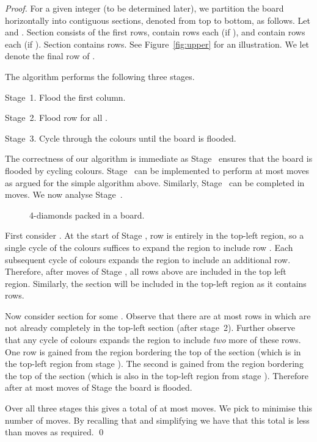 \documentclass[a4paper,11pt]{llncs}
\newcommand{\pgfgraphic}[1]{}
\newcounter{l}
\newcommand{\recdim}[2]{}
\begin{document}
\begin{proof}

For a given integer  (to be determined later), we partition the board horizontally into  contiguous sections, denoted  from top to bottom, as follows. Let  and . Section  consists of the first  rows,  contain  rows each (if ), and  contain  rows each (if ). Section  contains  rows. See Figure~\ref{fig:upper} for an illustration. We let  denote the final row of .

The algorithm performs the following three stages.
\begin{description}
    \item{Stage~1.} Flood the first column.
    \item{Stage~2.} Flood row  for all .
    \item{Stage~3.} Cycle through the  colours until the board is flooded.
\end{description}


The correctness of our algorithm is immediate as Stage~ ensures that the board is flooded by cycling colours. Stage~ can be implemented to perform at most  moves as argued for the simple algorithm above. Similarly, Stage~ can be completed in  moves. We now analyse Stage~.
\begin{figure}[t]
    \begin{minipage}[b]{0.50\linewidth}
        \centering
        \pgfgraphic{graphic-upper}
        \caption{The board decomposition used in the proof of Theorem~\ref{thm:good}.\label{fig:upper}}
    \end{minipage}\hspace{0.06\linewidth}\begin{minipage}[b]{0.44\linewidth}
        \centering
        \pgfgraphic{graphic-packed}
        \caption{4-diamonds packed in a \recdim{20}{20} board.\label{fig:packed}}
    \end{minipage}
\end{figure}

First consider . At the start of Stage , row  is entirely in the top-left region, so a single cycle of the  colours suffices to expand the region to include row . Each subsequent cycle of  colours expands the region to include an additional row. Therefore, after  moves of Stage , all rows above  are included in the top left region. Similarly, the section  will be included in the top-left region as it contains  rows.

Now consider section  for some . Observe that there are at most  rows in  which are not already completely in the top-left section (after stage~2). Further observe that any cycle of  colours expands the region to include \emph{two} more of these rows. One row is gained from the region bordering the top of the section (which is in the top-left region from stage ). The second is gained from the region bordering the top of the section (which is also in the top-left region from stage ). Therefore after at most  moves of Stage  the board is flooded.

Over all three stages this gives a total of at most  moves. We pick  to minimise this number of moves. By recalling that  and simplifying we have that this total is less than  moves as required. \qed
\end{proof}
\end{document}
